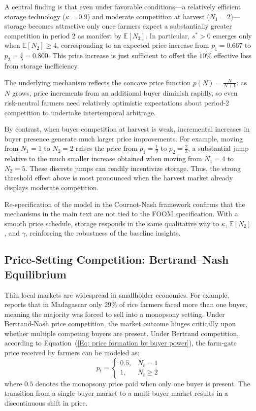 A central finding is that even under favorable conditions---a relatively efficient storage technology ($\kappa = 0.9$) and moderate competition at harvest ($N_1 = 2$)---storage becomes attractive only once farmers expect a substantially greater competition in period 2 as manifest by $\mathbb{E}[N_2]$. In particular, $s^*>0$ emerges only when $\mathbb{E}[N_2] \ge 4$, corresponding to an expected price increase from $p_1 = 0.667$ to $p_2 = \tfrac{4}{5} = 0.800$. This price increase is just sufficient to offset the $10\%$ effective loss from storage inefficiency.

The underlying mechanism reflects the concave price function $p(N) = \tfrac{N}{N+1}$: as $N$ grows, price increments from an additional buyer diminish rapidly, so even risk-neutral farmers need relatively optimistic expectations about period-2 competition to undertake intertemporal arbitrage.

By contrast, when buyer competition at harvest is weak, incremental increases in buyer presence generate much larger price improvements. For example, moving from $N_1=1$ to $N_2=2$ raises the price from $p_1=\tfrac{1}{2}$ to $p_2=\tfrac{2}{3}$, a substantial jump relative to the much smaller increase obtained when moving from $N_1=4$ to $N_2=5$. These discrete jumps can readily incentivize storage. Thus, the strong threshold effect above is most pronounced when the harvest market already displays moderate competition.

Re-specification of the model in the Cournot-Nash framework confirms that the mechanisms in the main text are not tied to the FOOM specification. With a smooth price schedule, storage responds in the same qualitative way to $\kappa$, $\mathbb{E}[N_2]$, and $\gamma$, reinforcing the robustness of the baseline insights.



\subsection{Price-Setting Competition: Bertrand--Nash Equilibrium}
\noindent
Thin local markets are widespread in smallholder economies. For example, \citet{Barrett_WD_1997} reports that in Madagascar only 29\% of rice farmers faced more than one buyer, meaning the majority was forced to sell into a monopsony setting. Under Bertrand-Nash price competition, the market outcome hinges critically upon whether multiple competing buyers are present. Under Bertrand competition, according to Equation~(\ref{Eq: price formation by buyer power}), the farm-gate price received by farmers can be modeled as:
\begin{equation}
p_t = 
\begin{cases}
0.5, & N_t = 1 \\
1, & N_t \geq 2
\end{cases}
\label{Eq: Bertrand Price Schedule}
\end{equation}
\noindent where $0.5$ denotes the monopsony price paid when only one buyer is present. The transition from a single-buyer market to a multi-buyer market results in a discontinuous shift in price.

